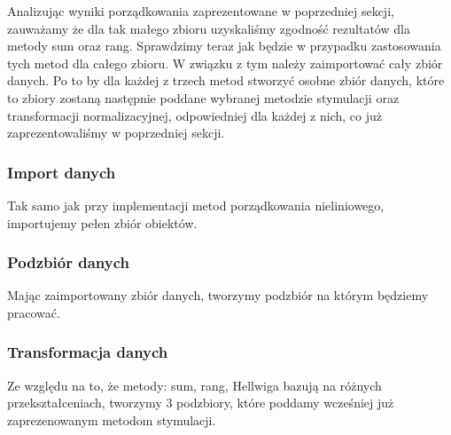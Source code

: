 \documentclass[12pt,a4paper]{report}
\begin{document}
{Analizując wyniki porządkowania zaprezentowane w poprzedniej sekcji, zauważamy że dla tak małego zbioru uzyskaliśmy zgodność rezultatów dla metody sum oraz rang. Sprawdzimy teraz jak będzie w przypadku zastosowania tych metod dla całego zbioru. W związku z tym należy zaimportować cały zbiór danych. Po to by dla każdej z trzech metod stworzyć osobne zbiór danych, które to zbiory zostaną następnie poddane wybranej metodzie stymulacji oraz transformacji normalizacyjnej, odpowiedniej dla każdej z nich, co już zaprezentowaliśmy w poprzedniej sekcji.  

\subsubsection{Import danych}
Tak samo jak przy implementacji metod porządkowania nieliniowego, importujemy pełen zbiór obiektów.

\begin{Shaded}
\begin{Highlighting}[]
\StringTok{ }\NormalTok{(}\NormalTok{, }
                            \NormalTok{)}
\end{Highlighting}
\end{Shaded}

\subsubsection{Podzbiór danych}
Mając zaimportowany zbiór danych, tworzymy podzbiór na którym będziemy pracować. 
\begin{Shaded}
\begin{Highlighting}[]
\NormalTok{dane_porzadkowanie<-zbior_danych[}\NormalTok{(}\NormalTok{,}\NormalTok{,}\NormalTok{,}
                                   \NormalTok{,}
                                   \NormalTok{,}\NormalTok{)]}
\end{Highlighting}
\end{Shaded}

\subsubsection{Transformacja danych}
Ze względu na to, że metody: sum, rang, Hellwiga bazują na różnych przekształceniach, tworzymy 3 podzbiory, które poddamy wcześniej już zaprezenowanym metodom stymulacji. 

}
\end{document}
